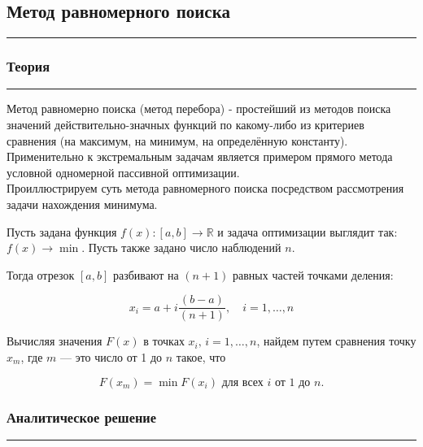 \documentclass[a4paper, 14pt]{extarticle}
\begin{document}

\subsection*{Метод равномерного поиска}\vspace{-20pt}\rule{\linewidth}{0.1mm}
\vspace{-30pt}
\subsubsection*{Теория}\vspace{-20pt}\rule{\linewidth}{0.1mm}

Метод равномерно поиска (метод перебора) - простейший из методов поиска значений 
действительно-значных функций по какому-либо из критериев сравнения 
(на максимум, на минимум, на определённую константу). Применительно к экстремальным 
задачам является примером прямого метода условной одномерной пассивной оптимизации.\\[1em]

Проиллюстрируем суть метода равномерного поиска посредством рассмотрения задачи нахождения минимума.

Пусть задана функция \( f(x): [a, b] \rightarrow \mathbb{R} \) и задача оптимизации выглядит так: \( f(x) \rightarrow \min \). Пусть также задано число наблюдений \( n \).\newpage

Тогда отрезок \([a, b]\) разбивают на \((n+1)\) равных частей точками деления:

\[
x_i = a + i \frac{(b - a)}{(n + 1)}, \quad i = 1, \ldots, n
\]

Вычисляя значения \( F(x) \) в точках \( x_i, \, i = 1, \ldots, n \), найдем путем сравнения точку \( x_m \), где \( m \) — это число от 1 до \( n \) такое, что

\[
F(x_m) = \min F(x_i) \text{ для всех } i \text{ от 1 до } n.
\]

\subsubsection*{Аналитическое решение}\vspace{-20pt}\rule{\linewidth}{0.1mm}
\end{document}
